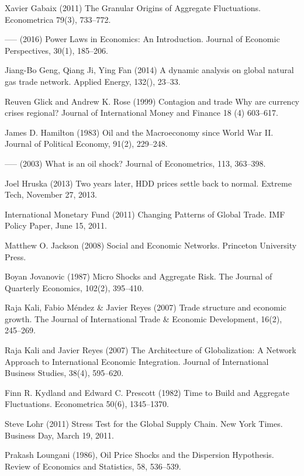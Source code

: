 \documentclass[10pt,letterpaper]{article}
\begin{document}
\begin{thebibliography}{99}
Xavier Gabaix (2011) The Granular Origins of Aggregate Fluctuations. Econometrica 79(3), 733--772.

----- (2016) Power Laws in Economics: An Introduction. Journal of Economic Perspectives, 30(1), 185--206.

Jiang-Bo Geng, Qiang Ji, Ying Fan (2014) A dynamic analysis on global natural gas trade network. Applied Energy, 132(), 23--33.

Reuven Glick and Andrew K. Rose (1999) Contagion and trade Why are currency crises regional? Journal of International Money and Finance 18 (4) 603--617.

James D. Hamilton (1983) Oil and the Macroeconomy since World War II. Journal of Political Economy, 91(2), 229--248.

----- (2003) What is an oil shock? Journal of Econometrics, 113, 363--398.

Joel Hruska (2013) Two years later, HDD prices settle back to normal. Extreme Tech, November 27, 2013. 

International Monetary Fund (2011) Changing Patterns of Global Trade. IMF Policy Paper, June 15, 2011.

Matthew O. Jackson (2008) Social and Economic Networks. Princeton University Press.

Boyan Jovanovic (1987) Micro Shocks and Aggregate Risk. The Journal of Quarterly Economics, 102(2), 395--410.

Raja Kali, Fabio M\'endez \& Javier Reyes (2007) Trade structure and economic growth. The Journal of International Trade \& Economic Development, 16(2), 245--269.

Raja Kali and Javier Reyes (2007) The Architecture of Globalization: A Network Approach to International Economic Integration. Journal of International Business Studies, 38(4), 595--620.

Finn R. Kydland and Edward C. Prescott (1982) Time to Build and Aggregate Fluctuations. Econometrica 50(6), 1345--1370.

Steve Lohr (2011) Stress Test for the Global Supply Chain. New York Times. Business Day, March 19, 2011. 

Prakash Loungani (1986), Oil Price Shocks and the Dispersion Hypothesis. Review of Economics and Statistics, 58, 536--539.


\end{thebibliography}
\end{document}
